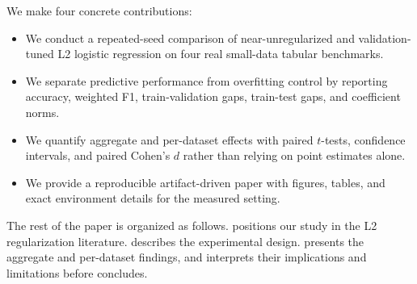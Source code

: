  We make four concrete contributions:
\begin{itemize}[leftmargin=*,itemsep=0pt,topsep=2pt]
    \item We conduct a repeated-seed comparison of near-unregularized and validation-tuned L2 logistic regression on four real small-data tabular benchmarks.
    \item We separate predictive performance from overfitting control by reporting accuracy, weighted F1, train-validation gaps, train-test gaps, and coefficient norms.
    \item We quantify aggregate and per-dataset effects with paired $t$-tests, confidence intervals, and paired Cohen's $d$ rather than relying on point estimates alone.
    \item We provide a reproducible artifact-driven paper with figures, tables, and exact environment details for the measured setting.
\end{itemize}

The rest of the paper is organized as follows.  positions our study in the L2 regularization literature.  describes the experimental design.  presents the aggregate and per-dataset findings, and  interprets their implications and limitations before  concludes.
